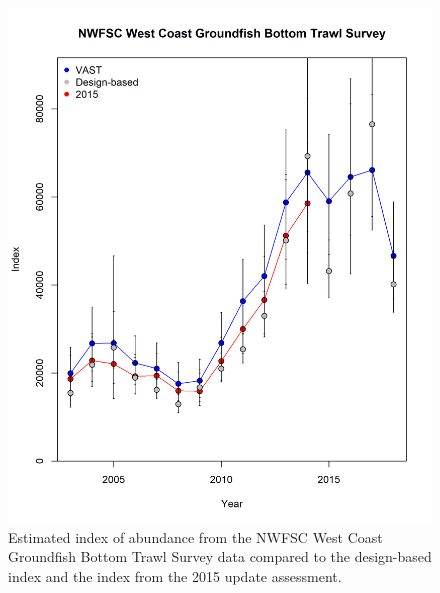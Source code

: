 \documentclass[12pt,]{article}
\begin{document}
\begin{figure}
\centering
\includegraphics{Figures/NWFSC_Index.png}
\caption{Estimated index of abundance from the NWFSC West Coast
Groundfish Bottom Trawl Survey data compared to the design-based index
and the index from the 2015 update assessment. \label{fig:nw_index}}
\end{figure}

\FloatBarrier
\end{document}

